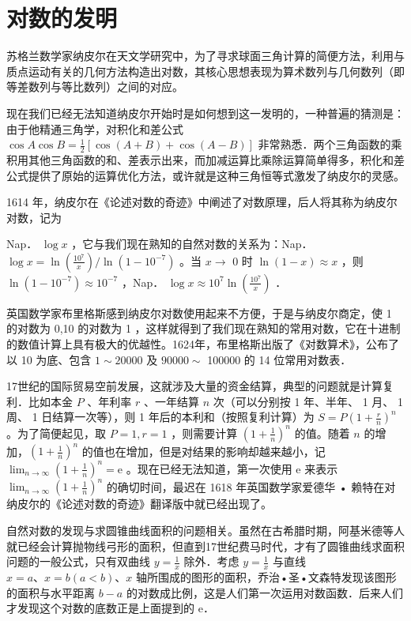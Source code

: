 \documentclass[10pt]{article}
\begin{document}
\section*{对数的发明}
苏格兰数学家纳皮尔在天文学研究中，为了寻求球面三角计算的简便方法，利用与质点运动有关的几何方法构造出对数，其核心思想表现为算术数列与几何数列（即等差数列与等比数列）之间的对应。

现在我们已经无法知道纳皮尔开始时是如何想到这一发明的，一种普遍的猜测是：由于他精通三角学，对积化和差公式 \(\cos A \cos B=\frac{1}{2}[\cos (A+B)+\cos (A-B)]\) 非常熟悉．两个三角函数的乘积用其他三角函数的和、差表示出来，而加减运算比乘除运算简单得多，积化和差公式提供了原始的运算优化方法，或许就是这种三角恒等式激发了纳皮尔的灵感。

1614 年，纳皮尔在《论述对数的奇迹》中阐述了对数原理，后人将其称为纳皮尔对数，记为

Nap． \(\log x\) ，它与我们现在熟知的自然对数的关系为：Nap． \(\log x=\ln \left(\frac{10^{7}}{x}\right) / \ln \left(1-10^{-7}\right)\) 。当 \(x \rightarrow\) 0 时 \(\ln (1-x) \approx x\) ，则 \(\ln \left(1-10^{-7}\right) \approx 10^{-7}\) ，Nap． \(\log x \approx 10^{7} \ln \left(\frac{10^{7}}{x}\right)\) ．

英国数学家布里格斯感到纳皮尔对数使用起来不方便，于是与纳皮尔商定，使 1 的对数为 0,10 的对数为 1 ，这样就得到了我们现在熟知的常用对数，它在十进制的数值计算上具有极大的优越性。1624年，布里格斯出版了《对数算术》，公布了以 10 为底、包含 \(1 \sim 20000\) 及 \(90000 \sim\) 100000 的 14 位常用对数表．

17世纪的国际贸易空前发展，这就涉及大量的资金结算，典型的问题就是计算复利．比如本金 \(P\) 、年利率 \(r\) 、一年结算 \(n\) 次（可以分别按 1 年、半年、 1 月、 1 周、 1 日结算一次等），则 1 年后的本利和（按照复利计算）为 \(S=P\left(1+\frac{r}{n}\right)^{n}\) 。为了简便起见，取 \(P=1, r=1\) ，则需要计算 \(\left(1+\frac{1}{n}\right)^{n}\) 的值。随着 \(n\) 的增加，\(\left(1+\frac{1}{n}\right)^{n}\) 的值也在增加，但是对结果的影响却越来越小，记 \(\lim _{n \rightarrow \infty}\left(1+\frac{1}{n}\right)^{n}=\mathrm{e}\) 。现在已经无法知道，第一次使用 e 来表示 \(\lim _{n \rightarrow \infty}\left(1+\frac{1}{n}\right)^{n}\) 的确切时间，最迟在 1618 年英国数学家爱德华 • 赖特在对纳皮尔的《论述对数的奇迹》翻译版中就已经出现了。

自然对数的发现与求圆锥曲线面积的问题相关。虽然在古希腊时期，阿基米德等人就已经会计算抛物线弓形的面积，但直到17世纪费马时代，才有了圆锥曲线求面积问题的一般公式，只有双曲线 \(y=\frac{1}{x}\) 除外．考虑 \(y=\frac{1}{x}\) 与直线 \(x=a 、 x=b(a<b) 、 x\) 轴所围成的图形的面积，乔治•圣•文森特发现该图形的面积与水平距离 \(b-a\) 的对数成比例，这是人们第一次运用对数函数．后来人们才发现这个对数的底数正是上面提到的 e．
\end{document}
